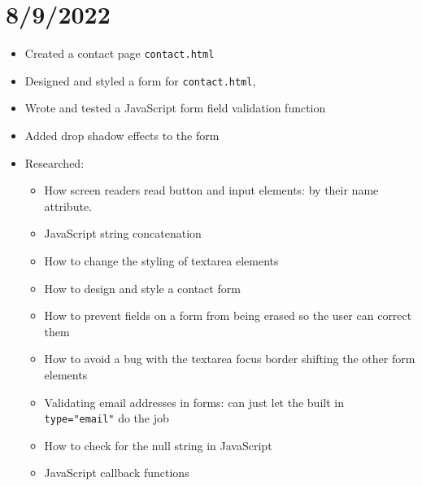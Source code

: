 \documentclass{article}
\begin{document}
\section*{8/9/2022}
\begin{itemize}
	\item Created a contact page \texttt{contact.html}
	\item Designed and styled a form for \texttt{contact.html}, 
	\item Wrote and tested a JavaScript form field validation function 
	\item Added drop shadow effects to the form
	\item Researched:
		\begin{itemize} 
	 			\item How screen readers read button and input elements: by their name attribute.
	 			\item JavaScript string concatenation
	 			\item How to change the styling of textarea elements
	 			\item How to design and style a contact form
	 			\item How to prevent fields on a form from being erased so the user can correct them
	 			\item How to avoid a bug with the textarea focus border shifting the other form elements
	 			\item Validating email addresses in forms: can just let the built in \texttt{type="email"} do the job
	 			\item How to check for the null string in JavaScript
	 			\item JavaScript callback functions

		\end{itemize}
\end{itemize}


















































	
\end{document}
